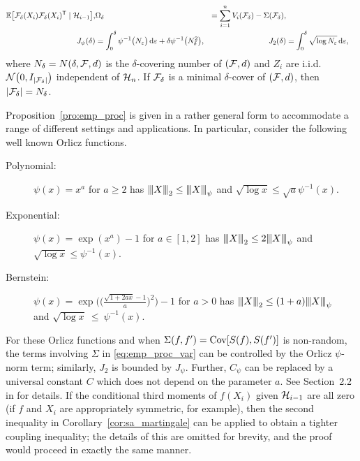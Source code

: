 \begin{proposition}
\begin{align*}
    \mathbb{E}\big[\mathcal{F}_\delta(X_i) \mathcal{F}_\delta(X_i)^{\mathsf{T}} \mid \mathcal{H}_{i-1} \big],
    &
    \Omega_\delta
    &=
    \sum_{i=1}^n V_i(\mathcal{F}_\delta) - \Sigma(\mathcal{F}_\delta), \\
    J_\psi(\delta)
    &=
    \int_0^\delta \psi^{-1}\big( N_\varepsilon \big)
    \,\mathrm{d}\varepsilon
    + \delta \psi^{-1} \big( N_\delta^2 \big),
    &
    J_2(\delta)
    &= \int_0^\delta \sqrt{\log N_\varepsilon}
    \,\mathrm{d}\varepsilon,
  \end{align*}
  where $N_\delta = N(\delta, \mathcal{F}, d)$
  is the $\delta$-covering number of $(\mathcal{F}, d)$
  and $Z_i$ are i.i.d.\ $\mathcal{N}\big(0, I_{|\mathcal{F}_\delta|}\big)$
  independent of $\mathcal{H}_n$.
  If $\mathcal{F}_\delta$ is a minimal $\delta$-cover
  of $(\mathcal{F}, d)$, then $|\mathcal{F}_\delta| = N_\delta$.
\end{proposition}

Proposition~\ref{pro:emp_proc}
is given in a rather general form to accommodate a range of different
settings and applications.
In particular, consider the following well known Orlicz functions.
%
\begin{description}

  \item[Polynomial:]
    $\psi(x) = x^a$ for $a \geq 2$
    has ${\vert\kern-0.25ex\vert\kern-0.25ex\vert} X {\vert\kern-0.25ex\vert\kern-0.25ex\vert}_2 \leq {\vert\kern-0.25ex\vert\kern-0.25ex\vert} X {\vert\kern-0.25ex\vert\kern-0.25ex\vert}_\psi$ and
    $\sqrt{\log x} \leq \sqrt{a} \psi^{-1}(x)$.

  \item[Exponential:]
    $\psi(x) = \exp(x^a) - 1$ for $a \in [1,2]$
    has ${\vert\kern-0.25ex\vert\kern-0.25ex\vert} X {\vert\kern-0.25ex\vert\kern-0.25ex\vert}_2 \leq 2{\vert\kern-0.25ex\vert\kern-0.25ex\vert} X {\vert\kern-0.25ex\vert\kern-0.25ex\vert}_\psi$ and
    $\sqrt{\log x} \leq \psi^{-1}(x)$.

  \item[Bernstein:]
    $\psi(x) = \exp
    \Big(
    \Big(\frac{\sqrt{1+2ax}-1}{a}\Big)^{2}
    \Big)-1$
    for $a > 0$ has
    ${\vert\kern-0.25ex\vert\kern-0.25ex\vert} X {\vert\kern-0.25ex\vert\kern-0.25ex\vert}_2 \leq (1+a){\vert\kern-0.25ex\vert\kern-0.25ex\vert} X {\vert\kern-0.25ex\vert\kern-0.25ex\vert}_\psi$ \\ and
    $\sqrt{\log x}~\leq~\psi^{-1}(x)$.

\end{description}
%
For these Orlicz functions and when $\Sigma(f, f') = \operatorname{Cov}[S(f), S(f')]$ is
non-random, the terms involving $\Sigma$ in \eqref{eq:emp_proc_var} can be
controlled by the Orlicz $\psi$-norm term; similarly, $J_2$ is bounded by
$J_\psi$. Further, $C_\psi$ can be replaced by a universal constant $C$ which
does not depend on the parameter $a$. See Section~2.2 in \citet{van1996weak}
for details. If the conditional third moments of $f(X_i)$ given $\mathcal{H}_{i-1}$ are
all zero (if $f$ and $X_i$ are appropriately symmetric, for example), then the
second inequality in Corollary~\ref{cor:sa_martingale} can be applied to obtain
a tighter coupling inequality; the details of this are omitted for brevity, and
the proof would proceed in exactly the same manner.

